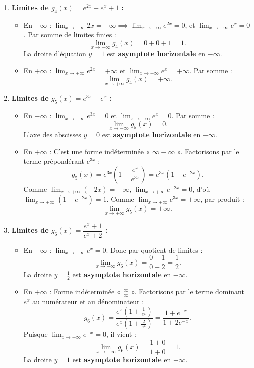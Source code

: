 \documentclass[11pt,a4paper]{article}
\begin{document}
\begin{correctionbox}[Exercice 9]
\begin{enumerate}[label=\textbf{\arabic*.}]
    \item \textbf{Limites de $g_4(x) = e^{2x} + e^x + 1$ :}
    \begin{itemize}
        \item En $-\infty$ : $\lim_{x \to -\infty} 2x = -\infty \implies \lim_{x \to -\infty} e^{2x} = 0$, et $\lim_{x \to -\infty} e^x = 0$.
        Par somme de limites finies :
        \[
        \boxed{\lim_{x \to -\infty} g_4(x) = 0 + 0 + 1 = 1}.
        \]
        La droite d'équation $y = 1$ est \textbf{asymptote horizontale} en $-\infty$.
        \item En $+\infty$ : $\lim_{x \to +\infty} e^{2x} = +\infty$ et $\lim_{x \to +\infty} e^x = +\infty$. Par somme :
        \[
        \boxed{\lim_{x \to +\infty} g_4(x) = +\infty}.
        \]
    \end{itemize}

    \item \textbf{Limites de $g_5(x) = e^{3x} - e^x$ :}
    \begin{itemize}
        \item En $-\infty$ : $\lim_{x \to -\infty} e^{3x} = 0$ et $\lim_{x \to -\infty} e^x = 0$. Par somme :
        \[
        \boxed{\lim_{x \to -\infty} g_5(x) = 0}.
        \]
        L'axe des abscisses $y = 0$ est \textbf{asymptote horizontale} en $-\infty$.
        \item En $+\infty$ : C'est une forme indéterminée « $\infty - \infty$ ».
        Factorisons par le terme prépondérant $e^{3x}$ :
        \[
        g_5(x) = e^{3x} \left(1 - \frac{e^x}{e^{3x}}\right) = e^{3x}(1 - e^{-2x}).
        \]
        Comme $\lim_{x \to +\infty} (-2x) = -\infty$, $\lim_{x \to +\infty} e^{-2x} = 0$, d'où $\lim_{x \to +\infty} (1 - e^{-2x}) = 1$.
        Comme $\lim_{x \to +\infty} e^{3x} = +\infty$, par produit :
        \[
        \boxed{\lim_{x \to +\infty} g_5(x) = +\infty}.
        \]
    \end{itemize}

    \item \textbf{Limites de $g_6(x) = \dfrac{e^x + 1}{e^x + 2}$ :}
    \begin{itemize}
        \item En $-\infty$ : $\lim_{x \to -\infty} e^x = 0$. Donc par quotient de limites :
        \[
        \boxed{\lim_{x \to -\infty} g_6(x) = \frac{0 + 1}{0 + 2} = \frac{1}{2}}.
        \]
        La droite $y = \frac{1}{2}$ est \textbf{asymptote horizontale} en $-\infty$.
        \item En $+\infty$ : Forme indéterminée « $\frac{\infty}{\infty}$ ».
        Factorisons par le terme dominant $e^x$ au numérateur et au dénominateur :
        \[
        g_6(x) = \frac{e^x\left(1 + \frac{1}{e^x}\right)}{e^x\left(1 + \frac{2}{e^x}\right)} = \frac{1 + e^{-x}}{1 + 2e^{-x}}.
        \]
        Puisque $\lim_{x \to +\infty} e^{-x} = 0$, il vient :
        \[
        \boxed{\lim_{x \to +\infty} g_6(x) = \frac{1 + 0}{1 + 0} = 1}.
        \]
        La droite $y = 1$ est \textbf{asymptote horizontale} en $+\infty$.
    \end{itemize}


\end{enumerate}
\end{correctionbox}
\end{document}
